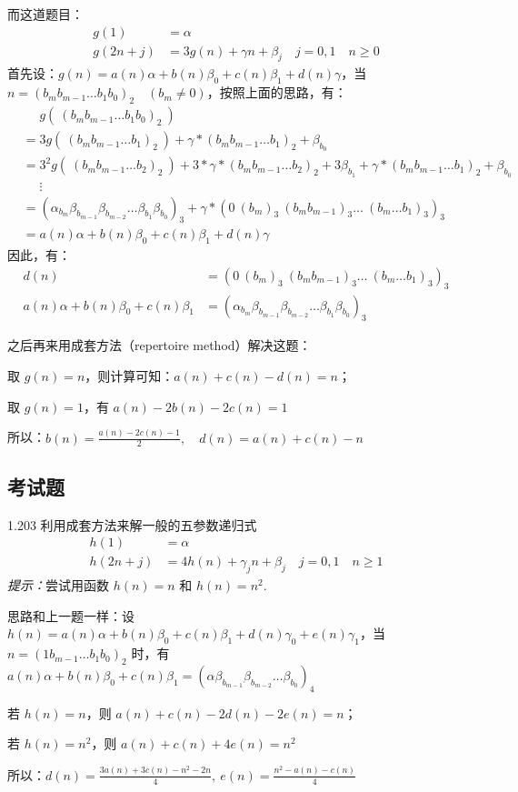而这道题目：
\begin{align*}
  g(1) &= \alpha \\
  g(2n+j) &= 3g(n) + \gamma n + \beta_j \quad j = 0, 1 \quad n \ge 0
\end{align*}
首先设：\( g(n) = a(n) \alpha + b(n) \beta_0 + c(n) \beta_1 + d(n) \gamma \)，当 \( n= (b_m b_{m-1} \dots b_1 b_0)_2 \quad (b_m \ne 0) \)，按照上面的思路，有：
\begin{align*}
  &\phantom{=} g(\ (b_m b_{m-1} \dots b_1 b_0)_2 \ ) \\
  &= 3g(\ (b_m b_{m-1} \dots b_1)_2 \ ) + \gamma * (b_m b_{m-1} \dots b_1)_2 + \beta_{b_0} \\
  &= 3^2g(\ (b_m b_{m-1} \dots b_2)_2 \ ) + 3 * \gamma * (b_m b_{m-1} \dots b_2)_2 + 3 \beta_{b_1} + \gamma * (b_m b_{m-1} \dots b_1)_2 + \beta_{b_0} \\
  &\phantom{=} \vdots \\
  &= (\alpha_{b_m} \beta_{b_{m-1}} \beta_{b_{m-2}} \dots \beta_{b_1} \beta_{b_0})_3 + \gamma * (0 \ (b_m)_3 \ (b_m b_{m-1})_3 \dots \ (b_m \dots b_1)_3)_3  \\
  &= a(n) \alpha + b(n) \beta_0 + c(n) \beta_1 + d(n) \gamma
\end{align*}
因此，有：
\begin{align*}
  d(n) &= (0 \ (b_m)_3 \ (b_m b_{m-1})_3 \dots \ (b_m \dots b_1)_3)_3 \\
  a(n) \alpha + b(n) \beta_0 + c(n) \beta_1 &= (\alpha_{b_m} \beta_{b_{m-1}} \beta_{b_{m-2}} \dots \beta_{b_1} \beta_{b_0})_3
\end{align*}

之后再来用成套方法（repertoire method）解决这题：

取 \( g(n) = n \)，则计算可知：\( a(n) + c(n) - d(n) = n \)；

取 \( g(n) = 1 \)，有 \( a(n) - 2b(n) - 2c(n) = 1 \)

所以：\( b(n) = \frac{a(n) - 2c(n) - 1}{2}, \quad d(n) = a(n) + c(n) - n \)

\subsection{考试题}

\begin{problem}{1.20}{3}
  利用成套方法来解一般的五参数递归式
  \begin{align*}
    h(1) &= \alpha \\
    h(2n+j) &= 4h(n) + \gamma_j n + \beta_j \quad j = 0, 1 \quad n \ge 1
  \end{align*}
  \textit{提示：}尝试用函数 \( h(n) = n \) 和 \( h(n) = n^2 \).
\end{problem}

思路和上一题一样：设 \( h(n) = a(n) \alpha + b(n) \beta_0 + c(n) \beta_1 + d(n) \gamma_0 + e(n) \gamma_1 \)，当 \( n = (1 b_{m-1} \dots b_1 b_0)_2 \) 时，有 \( a(n) \alpha + b(n) \beta_0 + c(n) \beta_1 = (\alpha \beta_{b_{m-1}} \beta_{b_{m-2}} \dots \beta_{b_0})_4 \)

若 \( h(n) = n \)，则 \( a(n)+c(n)-2d(n)-2e(n)=n \)；

若 \( h(n) = n^2 \)，则 \( a(n)+c(n)+4e(n)=n^2 \)

所以：\( d(n) = \frac{3a(n) + 3c(n) - n^2 - 2n}{4}, \ e(n) = \frac{n^2 - a(n) - c(n)}{4} \)
